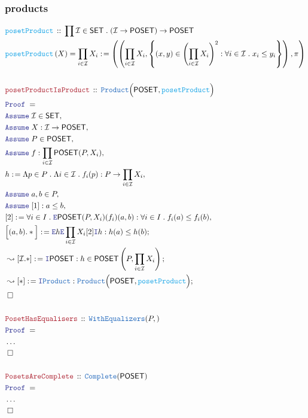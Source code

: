 \documentclass[12pt]{scrartcl}
\newcommand{\TYPE}[1]{\textcolor{NavyBlue}{\mathtt{#1}}}
\newcommand{\FUNC}[1]{\textcolor{Cerulean}{\mathtt{#1}}}
\newcommand{\LOGIC}[1]{\textcolor{Blue}{\mathtt{#1}}}
\newcommand{\THM}[1]{\textcolor{Maroon}{\mathtt{#1}}}
\renewcommand{\.}{\; . \;}
\newcommand{\de}{: \kern 0.1pc =}
\newcommand{\Act}[1]{\left( #1 \right)}
\newcommand{\Theorem}[2]{& \THM{#1} \, :: \, #2 \\ & \Proof = \\ }
\newcommand{\DeclareFunc}[2]{& \FUNC{#1} \, :: \, #2 \\}
\newcommand{\DefineNamedFunc}[4]{&  \FUNC{#1}\Act{#2} = #3 \de #4 \\}
\newcommand{\Page}[1]{ \begin{align*} #1 \end{align*}   }
\newcommand{\NoProof}{ & \ldots \\ \EndProof}
\newcommand{\Intro}{\LOGIC{I}}
\newcommand{\Elim}{\LOGIC{E}}
\newcommand{\Say}[3]{& #1 \de #2 : #3, \\}
\newcommand{\Conclude}[3]{& #1 \de #2 : #3; \\}
\newcommand{\DeriveConclude}[3]{& \leadsto #1 \de #2 : #3 ; \\}
\newcommand{\Assume}[2]{& \LOGIC{Assume} \; #1 : #2, \\}
\newcommand{\AssumeIn}[2]{& \LOGIC{Assume} \; #1 \in #2, \\}
\newcommand{\QED}{\; \square}
\newcommand{\EndProof}{& \QED \\}
\newcommand{\Proof}{\LOGIC{Proof} \; }
\newcommand{\I}{\mathcal{I}}
\newcommand{\SET}{\mathsf{SET}}
\newcommand{\POSET}{\mathsf{POSET}}
\begin{document}
\subsubsection{products}
\Page{
	\DeclareFunc{posetProduct}{\prod \I \in \SET \. (\I \to \POSET) \to \POSET}
	\DefineNamedFunc{posetProduct}{X}{\prod_{i \in \I} X_i}
	{ 
		\left(
		\left( 
			\prod_{i \in \I} X_i, 
			\left\{ (x,y) \in \left(\prod_{i \in \I} X_i  \right)^2 : \forall i \in \I \. x_i \le y_i \right\}  
		\right), \pi
		\right)
	}
	\\
	\Theorem{posetProductIsProduct}{ \TYPE{Product}\Big( \POSET, \FUNC{posetProduct} \Big) }
	\AssumeIn{\I}{\SET}
	\Assume{X}{\I \to \POSET}
	\AssumeIn{P}{\POSET}
	\Assume{f}{\prod_{i \in \I} \POSET(P,X_i)  }
	\Say{h}{ \Lambda p \in P \. \Lambda i \in \I \. f_i(p) }
	{ 
		P \to \prod_{i \in \I} X_i
	}
	\AssumeIn{a,b}{P}
	\Assume{[1]}{a \le b}
	\Say{[2]}{\forall i \in I \. \Elim \POSET(P,X_i)(f_i)(a,b) }
	{
		\forall i \in I \. f_i(a) \le f_i(b)
	}
	\Conclude{\Big[(a,b).*\Big]}{ \Elim h \Elim \prod_{i \in \I} X_i [2] \Intro h }
	{
		h(a) \le h(b)
	}
	\DeriveConclude{[\I.*]}{\Intro \POSET}
	{
		h \in \POSET\left(P, \prod_{i \in \I} X_i \right)
	}
	\DeriveConclude{[*]}{\Intro \TYPE{Product}}
	{
		\TYPE{Product}\Big(\POSET, \FUNC{posetProduct}  \Big)
	}
	\EndProof
	\\
	\Theorem{PosetHasEqualisers}{
		\TYPE{WithEqualizers}(P,)
	}
	\NoProof
	\\
	\Theorem{PosetsAreComplete}
	{
		\TYPE{Complete}(\POSET)
	}
	\NoProof
}
\end{document}
